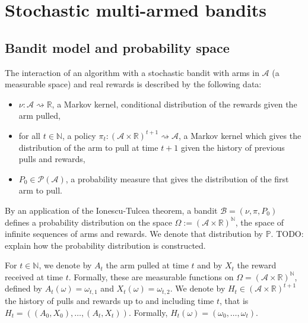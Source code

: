 \chapter{Stochastic multi-armed bandits}

\section{Bandit model and probability space}


\begin{definition}[Bandit]\label{def:bandit}
  \leanok
The interaction of an algorithm with a stochastic bandit with arms in $\mathcal{A}$ (a measurable space) and real rewards is described by the following data:
\begin{itemize}
  \item $\nu : \mathcal{A} \rightsquigarrow \mathbb{R}$, a Markov kernel, conditional distribution of the rewards given the arm pulled,
  \item for all $t \in \mathbb{N}$, a policy $\pi_t : (\mathcal{A} \times \mathbb{R})^{t+1} \rightsquigarrow \mathcal{A}$, a Markov kernel which gives the distribution of the arm to pull at time $t+1$ given the history of previous pulls and rewards,
  \item $P_0 \in \mathcal{P}(\mathcal{A})$, a probability measure that gives the distribution of the first arm to pull.
\end{itemize}
\end{definition}


\begin{definition}\label{def:Bandit.measure}
  \leanok
By an application of the Ionescu-Tulcea theorem, a bandit $\mathcal{B} = (\nu, \pi, P_0)$ defines a probability distribution on the space $\Omega := (\mathcal{A} \times \mathbb{R})^{\mathbb{N}}$, the space of infinite sequences of arms and rewards.
We denote that distribution by $\mathbb{P}$.
TODO: explain how the probability distribution is constructed.
\end{definition}


\begin{definition}\label{def:armAndReward}
  \leanok
For $t \in \mathbb{N}$, we denote by $A_t$ the arm pulled at time $t$ and by $X_t$ the reward received at time $t$.
Formally, these are measurable functions on $\Omega = (\mathcal{A} \times \mathbb{R})^{\mathbb{N}}$, defined by $A_t(\omega) = \omega_{t,1}$ and $X_t(\omega) = \omega_{t,2}$.
We denote by $H_t \in (\mathcal{A} \times \mathbb{R})^{t+1}$ the history of pulls and rewards up to and including time $t$, that is $H_t = ((A_0, X_0), \ldots, (A_t, X_t))$.
Formally, $H_t(\omega) = (\omega_0, \ldots, \omega_t)$.
\end{definition}


